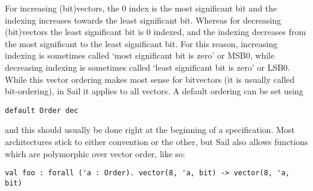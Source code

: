 \begin{center}
\qquad
{}
\end{center}

For increasing (bit)vectors, the 0 index is the most significant bit
and the indexing increases towards the least significant bit. Whereas
for decreasing (bit)vectors the least significant bit is 0 indexed,
and the indexing decreases from the most significant to the least
significant bit. For this reason, increasing indexing is sometimes
called `most significant bit is zero' or MSB0, while decreasing
indexing is sometimes called `least significant bit is zero' or
LSB0. While this vector ordering makes most sense for bitvectors (it
is usually called bit-ordering), in Sail it applies to all
vectors. A default ordering can be set using
\begin{lstlisting}
default Order dec
\end{lstlisting}
and this should usually be done right at the beginning of a
specification. Most architectures stick to either convention or the
other, but Sail also allows functions which are polymorphic over
vector order, like so:
\begin{lstlisting}
val foo : forall ('a : Order). vector(8, 'a, bit) -> vector(8, 'a, bit)
\end{lstlisting}


